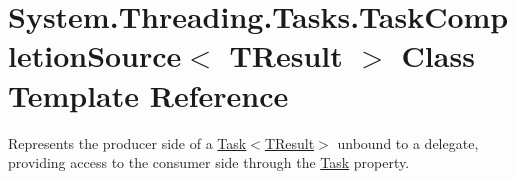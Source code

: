 \hypertarget{class_system_1_1_threading_1_1_tasks_1_1_task_completion_source}{}\section{System.\+Threading.\+Tasks.\+Task\+Completion\+Source$<$ T\+Result $>$ Class Template Reference}
\label{class_system_1_1_threading_1_1_tasks_1_1_task_completion_source}


Represents the producer side of a \hyperlink{class_system_1_1_threading_1_1_tasks_1_1_task}{Task$<$\+T\+Result$>$} unbound to a delegate, providing access to the consumer side through the \hyperlink{class_system_1_1_threading_1_1_tasks_1_1_task}{Task} property.  


